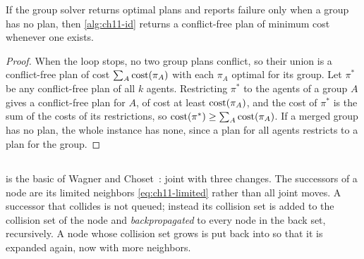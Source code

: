 \begin{proposition}
\label{thm:ch11-id}
If the group solver returns optimal plans and reports failure only when a
group has no plan, then \cref{alg:ch11-id} returns a conflict-free plan of
minimum cost whenever one exists.
\end{proposition}
\begin{proof}
When the loop stops, no two group plans conflict, so their union is a
conflict-free plan of cost $\sum_A \operatorname{cost}(\pi_A)$ with each $\pi_A$ optimal
for its group. Let $\pi^*$ be any conflict-free plan of all $k$ agents.
Restricting $\pi^*$ to the agents of a group $A$ gives a conflict-free plan
for $A$, of cost at least $\operatorname{cost}(\pi_A)$, and the cost of $\pi^*$ is the sum
of the costs of its restrictions, so $\operatorname{cost}(\pi^*) \ge \sum_A \operatorname{cost}(\pi_A)$.
If a merged group has no plan, the whole instance has none, since a plan
for all agents restricts to a plan for the group.
\end{proof}

\subsection{\mstar}
\label{sec:ch11-mstar}

 is the basic \mstar of Wagner and
Choset~\cite{wagner2011mstar,wagner2015subdimensional}: joint \astar with
three changes. The successors of a node are its limited neighbors
\cref{eq:ch11-limited} rather than all joint moves. A successor that
collides is not queued; instead its collision set is added to the
collision set of the node and \emph{backpropagated} to every node in the
back set, recursively. A node whose collision set grows is put back into
\Open so that it is expanded again, now with more neighbors.

